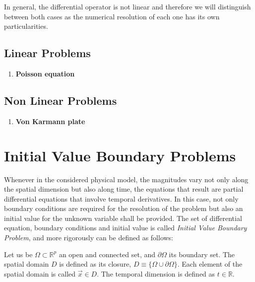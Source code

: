        In general, the differential operator is not linear and therefore we will distinguish between both cases as the numerical resolution of each one has its own particularities. 


       \subsection{Linear Problems}\label{LinearProblems}
       
       \begin{enumerate}
       	\item \textbf{Poisson equation}
       \end{enumerate}
        
       \subsection{Non Linear Problems}\label{NonLinearProblems}
       
       \begin{enumerate}
        \item \textbf{Von Karmann plate}
       \end{enumerate}
       \newpage
       \section{Initial Value Boundary Problems}
       
       Whenever in the considered physical model, the magnitudes vary not only along the spatial dimension but also along time, the equations that result are partial differential equations that involve temporal derivatives. In this case, not only boundary conditions are required for the resolution of the problem but also an initial value for the unknown variable shall be provided. The set of differential equation, boundary conditions and initial value is called \textit{Initial Value Boundary Problem}, and more rigorously can be defined as follows:
       
       Let us be $\Omega \subset \mathbb{ R}^p$ an open and connected set, and $\partial \Omega$ its boundary set. The spatial domain $D$ is defined as its closure, $D \equiv \{\Omega \cup \partial \Omega\}$. Each element of the spatial domain is called  $\vec{x} \in D $. The temporal dimension is defined as $t \in \mathbb{R} $. 
       
